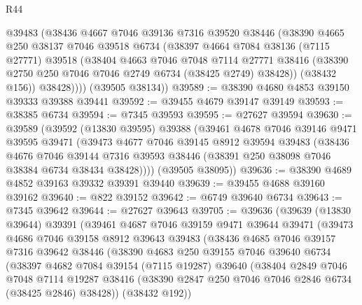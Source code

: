 \begin{lexlean}{R44}
\begin{coremodule}
{          @39483
          (@38436
            @4667
            @7046
            @39136
            @7316
            @39520
            @38446
            (@38390
              @4665
              @250
              @38137
              @7046
              @39518
              @6734
              (@38397
                @4664
                @7084
                @38136
                (@7115 @27771)
                @39518
                (@38404
                  @4663
                  @7046
                  @7048
                  @7114
                  @27771
                  @38416
                  (@38390 @2750 @250 @7046 @7046 @2749 @6734 (@38425 @2749) @38428))
                (@38432 @156))
              @38428))))
      (@39505 @38134))
@39589 := @38390 @4680 @4853 @39150 @39333 @39388 @39441
@39592 := @39455 @4679 @39147 @39149
@39593 := @38385 @6734
@39594 := @7345 @39593
@39595 := @27627 @39594
@39630 := @39589
    (@39592
      (@13830 @39595)
      @39388
      (@39461
        @4678
        @7046
        @39146
        @9471
        @39595
        @39471
        (@39473
          @4677
          @7046
          @39145
          @8912
          @39594
          @39483
          (@38436
            @4676
            @7046
            @39144
            @7316
            @39593
            @38446
            (@38391 @250 @38098 @7046 @38384 @6734 @38434 @38428))))
      (@39505 @38095))
@39636 := @38390 @4689 @4852 @39163 @39332 @39391 @39440
@39639 := @39455 @4688 @39160 @39162
@39640 := @822 @39152
@39642 := @6749 @39640 @6734
@39643 := @7345 @39642
@39644 := @27627 @39643
@39705 := @39636
    (@39639
      (@13830 @39644)
      @39391
      (@39461
        @4687
        @7046
        @39159
        @9471
        @39644
        @39471
        (@39473
          @4686
          @7046
          @39158
          @8912
          @39643
          @39483
          (@38436
            @4685
            @7046
            @39157
            @7316
            @39642
            @38446
            (@38390
              @4683
              @250
              @39155
              @7046
              @39640
              @6734
              (@38397
                @4682
                @7084
                @39154
                (@7115 @19287)
                @39640
                (@38404
                  @2849
                  @7046
                  @7048
                  @7114
                  @19287
                  @38416
                  (@38390 @2847 @250 @7046 @7046 @2846 @6734 (@38425 @2846) @38428))
                (@38432 @192))
}
\end{coremodule}
\end{lexlean}
